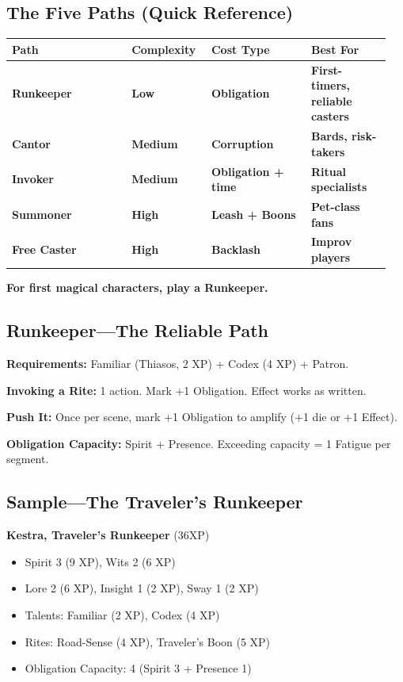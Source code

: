 \documentclass[10pt,twocolumn]{article} %
\begin{document}
\subsection{The Five Paths (Quick Reference)}
\begin{coretable}
\begin{tabular}{>{\bfseries}p{0.3\linewidth} >{\bfseries}p{0.2\linewidth} >{\bfseries}p{0.25\linewidth} >{\bfseries}p{0.2\linewidth}}
\toprule
\textbf{Path} & \textbf{Complexity} & \textbf{Cost Type} & \textbf{Best For} \\
\midrule
Runkeeper & Low & Obligation & First-timers, reliable casters \\
Cantor & Medium & Corruption & Bards, risk-takers \\
Invoker & Medium & Obligation + time & Ritual specialists \\
Summoner & High & Leash + Boons & Pet-class fans \\
Free Caster & High & Backlash & Improv players \\
\bottomrule
\end{tabular}
\end{coretable}
\textbf{For first magical characters, play a Runkeeper.}

\subsection{Runkeeper—The Reliable Path}
\textbf{Requirements:} Familiar (Thiasos, 2 XP) + Codex (4 XP) + Patron.

\textbf{Invoking a Rite:} 1 action. Mark +1 Obligation. Effect works as written.

\textbf{Push It:} Once per scene, mark +1 Obligation to amplify (+1 die or +1 Effect).

\textbf{Obligation Capacity:} Spirit + Presence. Exceeding capacity = 1 Fatigue per segment.

\subsection{Sample—The Traveler's Runkeeper}
\begin{sidebar}
    \textbf{Kestra, Traveler's Runkeeper} (36XP)
    \begin{itemize}[leftmargin=*]
        \item Spirit 3 (9 XP), Wits 2 (6 XP)
        \item Lore 2 (6 XP), Insight 1 (2 XP), Sway 1 (2 XP)
        \item Talents: Familiar (2 XP), Codex (4 XP)
        \item Rites: Road-Sense (4 XP), Traveler's Boon (5 XP)
        \item Obligation Capacity: 4 (Spirit 3 + Presence 1)
    \end{itemize}
\end{sidebar}
\end{document}
